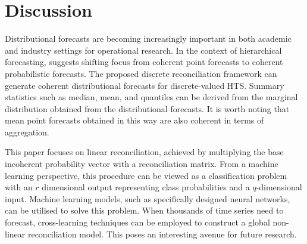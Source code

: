 \documentclass[a4paper,review,12pt,authoryear]{elsarticle}
\theoremstyle{definition}
\begin{document}
     \section{Discussion}
     \label{sec:discussion}



     Distributional forecasts are becoming increasingly important in both academic and industry settings for operational research. In the context of hierarchical forecasting, \cite{kolassaWeWantCoherent2022} suggests shifting focus from coherent point forecasts to coherent probabilistic forecasts.
     The proposed discrete reconciliation framework can generate coherent distributional forecasts for discrete-valued HTS.
     Summary statistics such as median, mean, and quantiles can be derived from the marginal distribution obtained from the distributional forecasts.
     It is worth noting that mean point forecasts obtained in this way are also coherent in terms of aggregation.

     This paper focuses on linear reconciliation, achieved by multiplying the base incoherent probability vector with a reconciliation matrix.
     From a machine learning perspective, this procedure can be viewed as a classification problem with an $r$ dimensional output representing class probabilities and a $q$-dimensional input. Machine learning models, such as specifically designed neural networks, can be utilised to solve this problem.
     When thousands of time series need to forecast, cross-learning techniques can be employed to construct a global non-linear reconciliation model. This poses an interesting avenue for future research.
\end{document}
